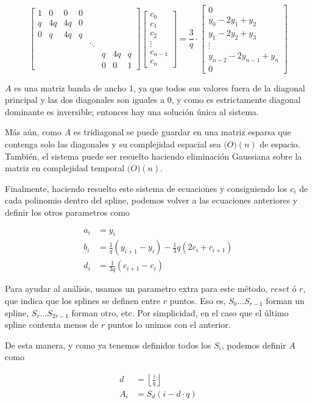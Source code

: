 \[
\begin{bmatrix}
1 & 0 & 0 & 0 \\
q & 4 q & 4 q & 0 \\
0 & q & 4 q & q \\
&&&& \ddots \\
&&&&& q & 4 q & q \\
&&&&& 0 & 0 & 1
\end{bmatrix}
\begin{bmatrix}
c_0 \\
c_1 \\
c_2 \\
\vdots \\
c_{n - 1} \\
c_n
\end{bmatrix}
=
\frac{3}{q} \cdot \begin{bmatrix}
0 \\
y_0 - 2 y_1 + y_2 \\
y_1 - 2 y_2 + y_3 \\
\vdots \\
y_{n - 2} - 2 y_{n - 1} + y_n \\
0
\end{bmatrix}
\]

$A$ es una matriz banda de ancho 1, ya que todos sus valores fuera de la
diagonal principal y las dos diagonales son iguales a $0$, y como es
estrictamente diagonal dominante es inversible; entonces hay una soluci\'on
\'unica al sistema.

M\'as a\'un, como $A$ es tridiagonal se puede guardar en una matriz esparsa que
contenga solo las diagonales y su complejidad espacial sea $\mathbb(O)(n)$ de
espacio. Tambi\'en, el sistema puede ser resuelto haciendo eliminaci\'on
Gaussiana sobre la matriz en complejidad temporal $\mathbb(O)(n)$.

Finalmente, haciendo resuelto este sistema de ecuaciones y consiguiendo los
$c_i$ de cada polinomio dentro del spline, podemos volver a las ecuaciones
anteriores y definir los otros parametros como

\[
\begin{split}
a_i & = y_i \\
b_i & = \frac{1}{q} (y_{i + 1} - y_i) - \frac{1}{3} q (2 c_i + c_{i + 1}) \\
d_i & = \frac{1}{3 q} (c_{i + 1} - c_i)
\end{split}
\]

Para ayudar al an\'alisis, usamos un parametro extra para este m\'etodo,
$reset$ \'o $r$, que indica que los splines se definen entre $r$ puntos. Eso es,
$S_0 \ldots S_{r - 1}$ forman un spline, $S_r \ldots S_{2r - 1}$ forman otro,
etc. Por simplicidad, en el caso que el \'ultimo spline contenta menos de $r$
puntos lo unimos con el anterior.

De esta manera, y como ya tenemos definidos todos los $S_i$, podemos definir $A$ como

\[
\begin{split}
d & = \left\lfloor \frac{i}{q} \right\rfloor \\
A_i & = S_d(i - d \cdot q)
\end{split}
\]
